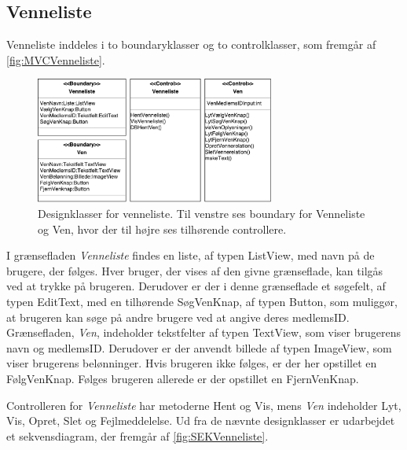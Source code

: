\subsection*{Venneliste}
Venneliste inddeles i to boundaryklasser og  to controlklasser, som fremgår af \autoref{fig:MVCVenneliste}. 

\begin{figure} [H]
\centering
\includegraphics[width=0.7\textwidth]{figures/MVC/MVCVenneliste}
\caption{Designklasser for venneliste. Til venstre ses boundary for Venneliste og Ven, hvor der til højre ses tilhørende controllere.}
\label{fig:MVCVenneliste}
\end{figure}

\noindent
I grænsefladen \textit{Venneliste} findes en liste, af typen ListView, med navn på de brugere, der følges. Hver bruger, der vises af den givne grænseflade, kan tilgås ved at trykke på brugeren. Derudover er der i denne grænseflade et søgefelt, af typen EditText, med en tilhørende SøgVenKnap, af typen Button, som muliggør, at brugeren kan søge på andre brugere ved at angive deres medlemsID. 
Grænsefladen, \textit{Ven}, indeholder tekstfelter af typen TextView, som viser brugerens navn og medlemsID. Derudover er der anvendt billede af typen ImageView, som viser brugerens belønninger. Hvis brugeren ikke følges, er der her opstillet en FølgVenKnap. Følges brugeren allerede er der opstillet en FjernVenKnap. 

Controlleren for \textit{Venneliste} har metoderne Hent og Vis, mens \textit{Ven} indeholder Lyt, Vis, Opret, Slet og Fejlmeddelelse.  
Ud fra de nævnte designklasser er udarbejdet et sekvensdiagram, der fremgår af \autoref{fig:SEKVenneliste}.

